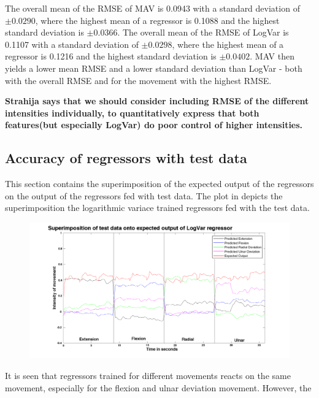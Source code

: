 The overall mean of the RMSE of MAV is 0.0943 with a standard deviation of $\pm 0.0290$, where the highest mean of a regressor is 0.1088 and the highest standard deviation is $\pm 0.0366$. The overall mean of the RMSE of LogVar is 0.1107 with a standard deviation of $\pm 0.0298$, where the highest mean of a regressor is 0.1216 and the highest standard deviation is $\pm 0.0402$. MAV then yields a lower mean RMSE and a lower standard deviation than LogVar - both with the overall RMSE and for the movement with the highest RMSE.


\textbf{Strahija says that we should consider including RMSE of the different intensities individually, to quantitatively express that both features(but especially LogVar) do poor control of higher intensities.}
\subsection{Accuracy of regressors with test data}
This section contains the superimposition of the expected output of the regressors on the output of the regressors fed with test data. The plot in  depicts the superimposition the logarithmic variace trained regressors fed with the test data.

\begin{figure}[H]
	\includegraphics[width=1\textwidth]{figures/results/NewSuperPoisonLogVarNewData}  %
	\caption{}
	\label{fig:SuperPoisonLogVarNewData}  %
\end{figure}

It is seen that regressors trained for different movements reacts on the same movement, especially for the flexion and ulnar deviation movement. However, the 

